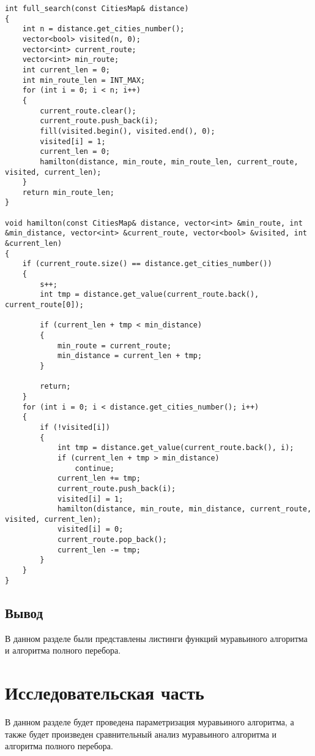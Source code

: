 \documentclass[a4paper, 14pt]{article}
\begin{document}
\begin{lstlisting}[label=pp,caption=Алгоритм полного перебора]
int full_search(const CitiesMap& distance)
{
    int n = distance.get_cities_number();
    vector<bool> visited(n, 0);
    vector<int> current_route;
    vector<int> min_route;
    int current_len = 0;
    int min_route_len = INT_MAX;
    for (int i = 0; i < n; i++)
    {
        current_route.clear();
        current_route.push_back(i);
        fill(visited.begin(), visited.end(), 0);
        visited[i] = 1;
        current_len = 0;
        hamilton(distance, min_route, min_route_len, current_route, visited, current_len);
    }
    return min_route_len;
}

void hamilton(const CitiesMap& distance, vector<int> &min_route, int &min_distance, vector<int> &current_route, vector<bool> &visited, int &current_len)
{
    if (current_route.size() == distance.get_cities_number())
    {
        s++;
        int tmp = distance.get_value(current_route.back(), current_route[0]);
        
        if (current_len + tmp < min_distance)
        {
            min_route = current_route;
            min_distance = current_len + tmp;
        }
        
        return;
    }
    for (int i = 0; i < distance.get_cities_number(); i++)
    {
        if (!visited[i])
        {
            int tmp = distance.get_value(current_route.back(), i);
            if (current_len + tmp > min_distance)
                continue;
            current_len += tmp;
            current_route.push_back(i);
            visited[i] = 1;
            hamilton(distance, min_route, min_distance, current_route, visited, current_len);
            visited[i] = 0;
            current_route.pop_back();
            current_len -= tmp;
        }
    }
}

\end{lstlisting}

	\subsection{Вывод}

В данном разделе были представлены листинги функций муравьиного алгоритма и алгоритма полного перебора.

	\newpage
	\section{Исследовательская часть}
	В данном разделе будет проведена параметризация муравьиного алгоритма, а также будет произведен сравнительный анализ муравьиного алгоритма и алгоритма полного перебора.\\
\end{document}
